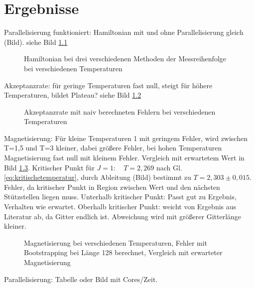 \documentclass{scrreprt}
\begin{document}
	
	 	
	\chapter{Ergebnisse}
	Parallelisierung funktioniert: Hamiltonian mit und ohne Parallelisierung gleich (Bild). siehe Bild \ref{fig:vergleichham}
	
	\begin{figure}[htbp]
		
		\label{fig:vergleichham}
		\caption{Hamiltonian bei drei verschiedenen Methoden der Messreihenfolge bei verschiedenen Temperaturen}
	\end{figure}
	Akzeptanzrate: für geringe Temperaturen fast null, steigt für höhere Temperaturen, bildet Plateau? siehe Bild \ref{fig:akzeptanzratenaiv}
	
	\begin{figure}[htbp]
		
		\label{fig:akzeptanzratenaiv}
		\caption{Akzeptanzrate mit naiv berechneten Fehlern bei verschiedenen Temperaturen}
	\end{figure}
	
	Magnetisierung: Für kleine Temperaturen 1 mit geringem Fehler, wird zwischen T=1,5 und T=3 kleiner, dabei größere Fehler, bei hohen Temperaturen Magnetisierung fast null mit kleinem Fehler. Vergleich mit erwartetem Wert in Bild \ref{fig:magnetisierungbootstrap-l-128}.
	Kritischer Punkt für $J=1:\quad T=2,269$ nach Gl. \ref{eq:kritischetemperatur}, durch Ableitung (Bild) bestimmt zu $T=2,303\pm0,015$. Fehler, da kritischer Punkt in Region zwischen Wert und den nächsten Stützstellen liegen muss.
	Unterhalb kritischer Punkt: Passt gut zu Ergebnis, Verhalten wie erwartet.
	Oberhalb kritischer Punkt: weicht von Ergebnis aus Literatur ab, da Gitter endlich ist. Abweichung wird mit größerer Gitterlänge kleiner.
	
	
	\begin{figure}[htbp]
		
		\label{fig:magnetisierungbootstrap-l-128}
		\caption{Magnetisierung bei verschiedenen Temperaturen, Fehler mit Bootstrapping bei Länge 128 berechnet, Vergleich mit erwarteter Magnetisierung}
	\end{figure}
		
	Parallelisierung: Tabelle oder Bild mit Cores/Zeit.
	\listoffigures
	
	
	
	\printbibliography[heading=bibintoc]
\end{document}
